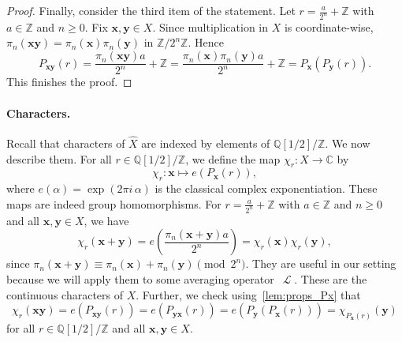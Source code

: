 \documentclass[12pt,reqno]{article}
\DeclareMathOperator{\Lop}{\mathcal{L}}
\newcommand{\Z}{\mathbb{Z}}
\begin{document}
\begin{proof}
Finally, consider the third item of the statement.
Let $r=\frac{a}{2^n}+\mathbb Z$ with $a\in\Z$ and $n\ge 0$.
Fix $\mathbf{x},\mathbf{y}\in X$.
Since multiplication in $X$ is coordinate-wise,  
\(
\pi_n(\mathbf{x}\mathbf{y})=\pi_n(\mathbf{x})\pi_n(\mathbf{y})
\)
 in $\mathbb Z/2^n\mathbb Z$.
Hence
\[
P_{\mathbf{x}\mathbf{y}}(r)=\frac{\pi_n(\mathbf{x}\mathbf{y})a}{2^n}+\mathbb Z=\frac{\pi_n(\mathbf{x})\pi_n(\mathbf{y})a}{2^n}+\mathbb Z=P_\mathbf{x}(P_\mathbf{y}(r)).
\]
This finishes the proof.
\end{proof}



\paragraph{Characters.}
Recall that characters of $ \widehat X$ are indexed by elements of $\mathbb{Q}[1/2]/\mathbb{Z}$. We now describe them. For all $r \in \mathbb{Q}[1/2]/\mathbb{Z}$, we define the map $\chi_r \colon X \to \mathbb{C}$ by
\[
  \chi_r:\mathbf{x}\mapsto e(P_\mathbf{x}(r)),
\]
where $e(\alpha)=\exp(2\pi i\, \alpha)$ is the classical complex exponentiation. These maps are indeed group homomorphisms. 
For $r=\frac{a}{2^n}+\mathbb Z$ with $a\in\Z$ and $n\ge 0$ and all $\mathbf{x},\mathbf{y}\in X$,  we have
\[
  \chi_r(\mathbf{x} + \mathbf{y}) = e\left( \frac{\pi_n(\mathbf{x}+\mathbf{y})a}{2^n}\right)=
  \chi_r(\mathbf{x}) \chi_r(\mathbf{y}),
\]
since $\pi_n(\mathbf{x}+\mathbf{y})\equiv\pi_n(\mathbf{x})+\pi_n(\mathbf{y})\pmod{2^n}$. 
They are useful in our setting because we will apply them to some averaging operator~$\Lop$. 
These are the continuous characters of $X$. 
Further, we check using~\cref{lem:props_Px} that
\begin{equation}
    \label{eq:chi_product}
    \chi_r(\mathbf{x}\mathbf{y}) = e(P_{\mathbf{x}\mathbf{y}}(r))= e(P_{\mathbf{y}\mathbf{x}}(r))= e(P_\mathbf{y}(P_\mathbf{x}(r)))= \chi_{P_\mathbf{x}(r)}(\mathbf{y})
\end{equation}
for all $r \in \mathbb{Q}[1/2]/\mathbb{Z}$ and all $\mathbf{x},\mathbf{y}\in X$.

\end{document}
